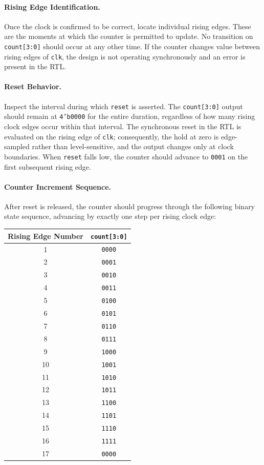 \paragraph{Rising Edge Identification.}
Once the clock is confirmed to be correct, locate individual rising edges.
These are the moments at which the counter is permitted to update. No
transition on \texttt{count[3:0]} should occur at any other time. If the
counter changes value between rising edges of \texttt{clk}, the design is
not operating synchronously and an error is present in the RTL.

\paragraph{Reset Behavior.}
Inspect the interval during which \texttt{reset} is asserted. The
\texttt{count[3:0]} output should remain at \texttt{4'b0000} for the
entire duration, regardless of how many rising clock edges occur within
that interval. The synchronous reset in the RTL is evaluated on the rising
edge of \texttt{clk}; consequently, the hold at zero is edge-sampled rather
than level-sensitive, and the output changes only at clock boundaries.
When \texttt{reset} falls low, the counter should advance to \texttt{0001}
on the first subsequent rising edge.

\paragraph{Counter Increment Sequence.}
After reset is released, the counter should progress through the following
binary state sequence, advancing by exactly one step per rising clock edge:

\begin{center}
\begin{tabular}{cc}
\hline
Rising Edge Number & \texttt{count[3:0]} \\
\hline
1  & \texttt{0000} \\
2  & \texttt{0001} \\
3  & \texttt{0010} \\
4  & \texttt{0011} \\
5  & \texttt{0100} \\
6  & \texttt{0101} \\
7  & \texttt{0110} \\
8  & \texttt{0111} \\
9  & \texttt{1000} \\
10 & \texttt{1001} \\
11 & \texttt{1010} \\
12 & \texttt{1011} \\
13 & \texttt{1100} \\
14 & \texttt{1101} \\
15 & \texttt{1110} \\
16 & \texttt{1111} \\
17 & \texttt{0000} \\
\hline
\end{tabular}
\end{center}

